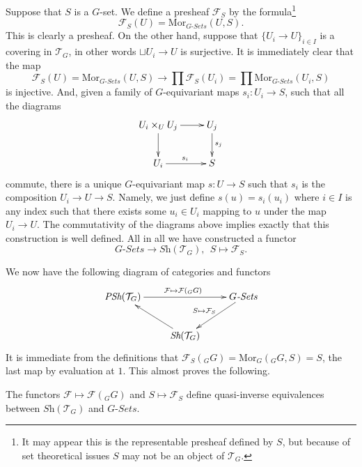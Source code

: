\medskip\noindent
Suppose that $S$ is a $G$-set. We define a presheaf
$\mathcal{F}_S$ by the formula\footnote{It may
appear this is the representable presheaf defined by
$S$, but because of set theoretical issues $S$ may not
be an object of $\mathcal{T}_G$.}
$$
\mathcal{F}_S(U)
=
\text{Mor}_{G\textit{-Sets}}(U, S).
$$
This is clearly a presheaf. On the other hand, suppose that
$\{U_i \to U\}_{i\in I}$ is a covering in $\mathcal{T}_G$, in other
words $\sqcup U_i \to U$ is surjective. It is immediately
clear that the map
$$
\mathcal{F}_S(U)
=
\text{Mor}_{G\textit{-Sets}}(U, S)
\longrightarrow
\prod \mathcal{F}_S(U_i)
=
\prod \text{Mor}_{G\textit{-Sets}}(U_i, S)
$$
is injective. And, given a family of $G$-equivariant
maps $s_i : U_i \to S$, such that all the diagrams
$$
\xymatrix{
U_i\times_U U_j \ar[d] \ar[r]
&
U_j \ar[d]^{s_j}
\\
U_i \ar[r]^{s_i}
&
S
}
$$
commute, there is a unique $G$-equivariant map
$s : U \to S$ such that $s_i$ is the composition
$U_i \to U \to S$. Namely, we just define $s(u) = s_i(u_i)$
where $i\in I$ is any index such that there exists some
$u_i \in U_i$ mapping to $u$ under the map $U_i \to U$.
The commutativity of the diagrams above implies exactly
that this construction is well defined. All in all we have
constructed a functor
$$
G\textit{-Sets}
\longrightarrow
\textit{Sh}(\mathcal{T}_G),\ \ 
S
\longmapsto
\mathcal{F}_S
.
$$

\medskip\noindent
We now have the following diagram of categories and functors
$$
\xymatrix{
\textit{PSh}(\mathcal{T}_G) \ar[rr]^{\mathcal{F} \mapsto \mathcal{F}({}_GG)}
&
&
G\textit{-Sets} \ar[ld]_{S \mapsto \mathcal{F}_S}
\\
&
\textit{Sh}(\mathcal{T}_G) \ar[lu]
&
}
$$
It is immediate from the definitions that $\mathcal{F}_S({}_GG)
= \text{Mor}_G({}_GG, S) = S$, the last map by evaluation at $1$.
This almost proves the following.

\begin{proposition}
\label{propostion-sheaves-on-group}
The functors $\mathcal{F} \mapsto \mathcal{F}({}_GG)$
and $S \mapsto \mathcal{F}_S$ define quasi-inverse 
equivalences between $\textit{Sh}(\mathcal{T}_G)$
and $G\textit{-Sets}$.
\end{proposition}

